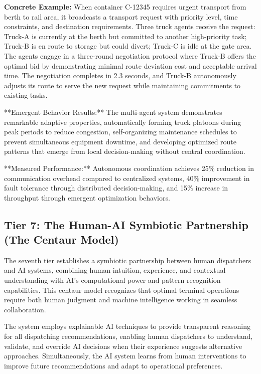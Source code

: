 \documentclass{article}
\begin{document}
\textbf{Concrete Example:} When container C-12345 requires urgent transport from berth to rail area, it broadcasts a transport request with priority level, time constraints, and destination requirements. Three truck agents receive the request: Truck-A is currently at the berth but committed to another high-priority task; Truck-B is en route to storage but could divert; Truck-C is idle at the gate area. The agents engage in a three-round negotiation protocol where Truck-B offers the optimal bid by demonstrating minimal route deviation cost and acceptable arrival time. The negotiation completes in 2.3 seconds, and Truck-B autonomously adjusts its route to serve the new request while maintaining commitments to existing tasks.

**Emergent Behavior Results:** The multi-agent system demonstrates remarkable adaptive properties, automatically forming truck platoons during peak periods to reduce congestion, self-organizing maintenance schedules to prevent simultaneous equipment downtime, and developing optimized route patterns that emerge from local decision-making without central coordination.

**Measured Performance:** Autonomous coordination achieves 25\% reduction in communication overhead compared to centralized systems, 40\% improvement in fault tolerance through distributed decision-making, and 15\% increase in throughput through emergent optimization behaviors.

\subsection{Tier 7: The Human-AI Symbiotic Partnership (The Centaur Model)}

The seventh tier establishes a symbiotic partnership between human dispatchers and AI systems, combining human intuition, experience, and contextual understanding with AI's computational power and pattern recognition capabilities. This centaur model recognizes that optimal terminal operations require both human judgment and machine intelligence working in seamless collaboration.

The system employs explainable AI techniques to provide transparent reasoning for all dispatching recommendations, enabling human dispatchers to understand, validate, and override AI decisions when their experience suggests alternative approaches. Simultaneously, the AI system learns from human interventions to improve future recommendations and adapt to operational preferences.
\end{document}
